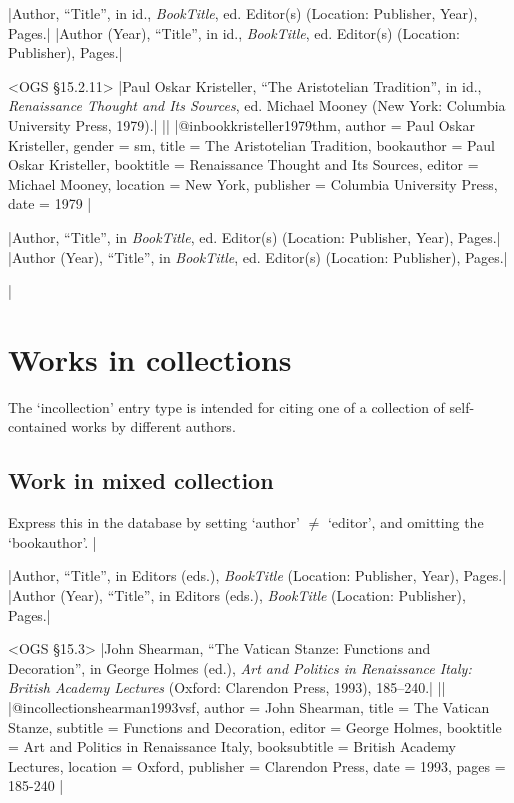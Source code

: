 \documentclass[extrafontsizes,11pt,a4paper,oneside]{memoir}
\newcommand*{\lit}[1]{\textsf{#1}}
\newcommand*{\code}[1]{`\textsf{#1}'}
\begin{document}
\specs
|Author, \enquote{Title}, \lit{in id.}, \emph{BookTitle}, \lit{ed.} Editor(s) (Location: Publisher, Year), Pages.|%
|Author (Year), \enquote{Title}, \lit{in id.}, \emph{BookTitle}, \lit{ed.} Editor(s) (Location: Publisher), Pages.|

\bibexample<OGS \S15.2.11>
|Paul Oskar Kristeller, \enquote{The Aristotelian Tradition}, in id., \emph{Renaissance Thought and Its Sources}, ed. Michael Mooney (New York: Columbia University Press, 1979).|%
||%
|@inbook{kristeller1979thm,
  author = {Paul Oskar Kristeller},
  gender = {sm},
  title = {The Aristotelian Tradition},
  bookauthor = {Paul Oskar Kristeller},
  booktitle = {Renaissance Thought and Its Sources},
  editor = {Michael Mooney},
  location = {New York},
  publisher = {Columbia University Press},
  date = {1979}
}|

\specs
|Author, \enquote{Title}, \lit{in} \emph{BookTitle}, \lit{ed.} Editor(s) (Location: Publisher, Year), Pages.|%
|Author (Year), \enquote{Title}, \lit{in} \emph{BookTitle}, \lit{ed.} Editor(s) (Location: Publisher), Pages.|

\todoc|
\section{Works in collections}

The \code{incollection} entry type is intended for citing one of a collection of self-contained works by different authors.

\subsection{Work in mixed collection}

Express this in the database by setting \code{author} $\neq$ \code{editor}, and omitting the \code{bookauthor}.
|

\specs
|Author, \enquote{Title}, \lit{in} Editors (\lit{eds.}), \emph{BookTitle} (Location: Publisher, Year), Pages.|%
|Author (Year), \enquote{Title}, \lit{in} Editors (\lit{eds.}), \emph{BookTitle} (Location: Publisher), Pages.|

\bibexample<OGS \S15.3>
|John Shearman, \enquote{The Vatican Stanze: Functions and Decoration}, in George Holmes (ed.), \emph{Art and Politics in Renaissance Italy: British Academy Lectures} (Oxford: Clarendon Press, 1993), 185--240.|%
||%
|@incollection{shearman1993vsf,
  author = {John Shearman},
  title = {The Vatican Stanze},
  subtitle = {Functions and Decoration},
  editor = {George Holmes},
  booktitle = {Art and Politics in Renaissance Italy},
  booksubtitle = {British Academy Lectures},
  location = {Oxford},
  publisher = {Clarendon Press},
  date = {1993},
  pages = {185-240}
}|
\end{document}
